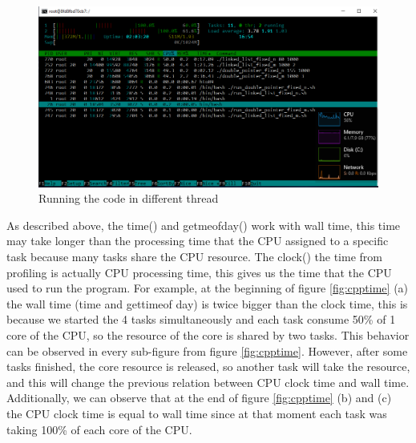 \documentclass[12pt]{article}
\begin{document}
    \begin{figure}[H]
    \centering
    
    \includegraphics[width=\linewidth]{figures/run.png}
    
    \caption{Running the code in different thread} 
    \label{fig:run}
\end{figure}

As described above, the time() and getmeofday() work with wall time, this time may take longer than the processing time that the CPU assigned to a specific task because many tasks share the CPU resource. The clock() the time from profiling is actually CPU processing time, this gives us the time that the CPU used to run the program. For example, at the beginning of figure  \ref{fig:cpptime}  (a) the wall time (time and gettimeof day) is twice bigger than the clock time, this is because we started the 4 tasks simultaneously and each task consume 50\% of 1 core of the CPU, so the  resource of the core is shared by two tasks. This behavior can be observed in every sub-figure from figure \ref{fig:cpptime}. However, after some tasks finished, the core resource is released, so another task will take the resource, and this will change the previous relation between CPU clock time and wall time. Additionally, we can observe that at the end of figure \ref{fig:cpptime} (b) and (c) the CPU clock time is equal to wall time since at that moment each task was taking 100\% of each core of the CPU.
\end{document}
